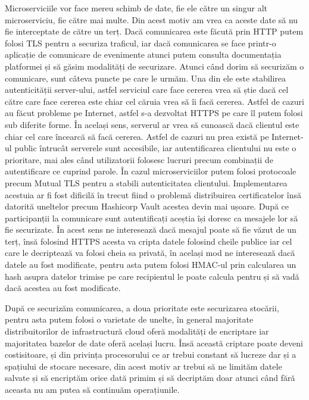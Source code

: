 Microserviciile vor face mereu schimb de date, fie ele către un singur alt microserviciu,
fie către mai multe. Din acest motiv am vrea ca aceste date să nu fie interceptate
de către un terț. Dacă comunicarea este făcută prin HTTP putem folosi TLS pentru a securiza traficul,
iar dacă comunicarea se face printr-o aplicație de comunicare de evenimente atunci
putem consulta documentația platformei și să găsim modalități de securizare. Atunci când
dorim să securizăm o comunicare, sunt câteva puncte pe care le urmăm. Una din ele este
stabilirea autenticității server-ului, astfel serviciul care face cererea vrea să știe dacă
cel către care face cererea este chiar cel căruia vrea să îi facă cererea. Astfel de cazuri
au făcut probleme pe Internet, astfel s-a dezvoltat HTTPS pe care îl putem folosi sub diferite
forme. În același sens, serverul ar vrea să cunoască dacă clientul este chiar cel care încearcă
să facă cererea. Astfel de cazuri nu prea există pe Internet-ul public întrucât serverele sunt accesibile,
iar autentificarea clientului nu este o prioritare, mai ales când utilizatorii folosesc
lucruri precum combinații de autentificare ce cuprind parole. În cazul microserviciilor
putem folosi protocoale precum Mutual TLS pentru a stabili autenticitatea clientului. Implementarea
acestuia ar fi fost dificilă în trecut fiind o problemă distribuirea certificatelor însă
datorită uneltelor precum Hashicorp Vault acestea devin mai ușoare. După ce participanții
la comunicare sunt autentificați aceștia își doresc ca mesajele lor să fie securizate.
În acest sens ne interesează dacă mesajul poate să fie văzut de un terț, însă folosind
HTTPS acesta va cripta datele folosind cheile publice iar cel care le decriptează va folosi cheia
sa privată, în același mod ne interesează dacă datele au fost modificate, pentru asta putem folosi
HMAC-ul prin calcularea un hash asupra datelor trimise pe care recipientul le poate calcula
pentru și să vadă dacă acestea au fost modificate.

După ce securizăm comunicarea, a doua prioritate este securizarea stocării, pentru asta putem folosi
o varietate de unelte, în general majoritate distribuitorilor de infrastructură cloud
oferă modalități de encriptare iar majoritatea bazelor de date oferă același lucru. Însă această
criptare poate deveni costisitoare, și din privința procesorului ce ar trebui constant să lucreze
dar și a spațiului de stocare necesare, din acest motiv ar trebui să ne limităm datele salvate
și să encriptăm orice dată primim și să decriptăm doar atunci când fără aceasta nu am putea să continuăm
operațiunile.

